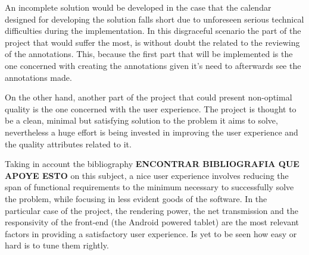 An incomplete solution would be developed in the case that the calendar designed for developing the solution falls short due to unforeseen serious technical difficulties during the implementation. In this disgraceful scenario the part of the project that would suffer the most, is without doubt the related to the reviewing of the annotations. This, because the first part that will be implemented is the one concerned with creating the annotations given it's need to afterwards see the annotations made.

On the other hand, another part of the project that could present non-optimal quality is the one concerned with the user experience. The project is thought to be a clean, minimal but satisfying solution to the problem it aims to solve, nevertheless a huge effort is being invested in improving the user experience and the quality attributes related to it. 

Taking in account the bibliography \textbf{ENCONTRAR BIBLIOGRAFIA QUE APOYE ESTO} on this subject, a nice user experience involves reducing the span of functional requirements to the minimum necessary to successfully solve the problem, while focusing in less evident goods of the software. In the particular case of the project, the rendering power, the net transmission and the responsivity of the front-end (the Android powered tablet) are the most relevant factors in providing a satisfactory user experience. Is yet to be seen how easy or hard is to tune them rightly.